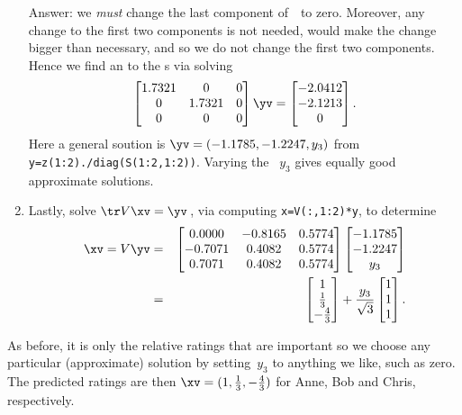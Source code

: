 \begin{example}
\begin{enumerate}
Answer: we \emph{must} change the last component of~\zv\ to zero. 
Moreover, any change to the first two components is not needed, would make the change bigger than necessary, and so we do not change the first two components.
Hence we find an  to the s via solving
\begin{equation*}
\begin{bmatrix} 1.7321&0&0
\\0&1.7321&0
\\0&0&0 \end{bmatrix}\yv=\begin{bmatrix} 
   -2.0412\\-2.1213\\0
\end{bmatrix}.
\end{equation*}
Here a general soution is \(\yv=(-1.1785,-1.2247,y_3)\) from \verb|y=z(1:2)./diag(S(1:2,1:2))|.
Varying the ~\(y_3\) gives equally good approximate solutions.

\item Lastly, solve \(\tr V\xv=\yv\)\,, via computing \verb|x=V(:,1:2)*y|, to determine
\begin{eqnarray*}
\xv=V\yv&=&
\begin{bmatrix} 0.0000 & -0.8165 & 0.5774
\\ -0.7071 & 0.4082 & 0.5774
\\  0.7071 & 0.4082 & 0.5774
 \end{bmatrix}\begin{bmatrix} -1.1785\\-1.2247\\y_3 \end{bmatrix}
\\&=&\begin{bmatrix} 1\\\frac13\\-\frac43 \end{bmatrix}
+\frac{y_3}{\sqrt3}\begin{bmatrix} 1\\1\\1 \end{bmatrix}.
\end{eqnarray*}
\end{enumerate}
As before, it is only the relative ratings that are important so we  choose any particular (approximate) solution by setting~\(y_3\) to anything we like, such as zero.
The predicted ratings are then \(\xv=(1,\frac13,-\frac43)\) for Anne, Bob and Chris, respectively.
\end{example}

